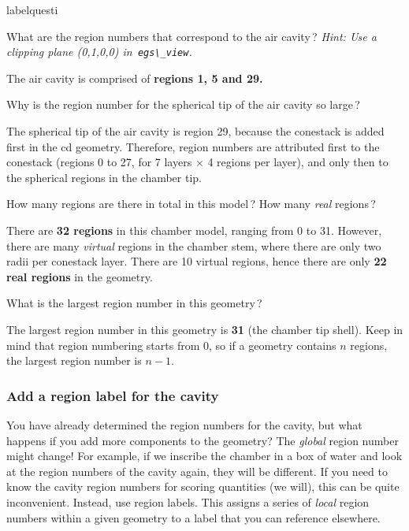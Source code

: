 \documentclass[12pt,twoside]{article}
\makeatletter
\renewcommand\thequesti         {\@arabic\c@questi}
\newenvironment{question}{
    \bfseries
    \edef\@questictr{questi}
    \expandafter
    \list \csname label\@questictr\endcsname {
        \usecounter\@questictr\def\makelabel##1{\hss\llap{##1}}
        \savebox{\questbox}             {\thequesti}
        \setlength\labelsep             {0.6em}
        \setlength\labelwidth           {\wd\questbox}
        \setlength\leftmargini          {\labelwidth}
        \addtolength{\leftmargini}      {\labelsep}
        \addtolength{\leftmargini}      {0.2em}
        \leftmargin\leftmargini
        \setlength\topsep               {1em}
        \setlength\itemsep              {1.2em}
        \setlength\parsep               {0.5em}
    }
}{\normalfont\endlist}
\newenvironment{answer}{\normalfont}{\relax}
\makeatother
\begin{document}
\begin{question}

\item What are the region numbers that correspond to the air cavity\,?
\textit{Hint: Use a clipping plane (0,1,0,0) in \,\Verb|egs\_view|.}

\begin{answer}
The air cavity is comprised of \textbf{regions 1, 5 and 29.}
\end{answer}

\item Why is the region number for the spherical tip of the air cavity so large\,?

\begin{answer}
The spherical tip of the air cavity is region 29, because the conestack is
added first in the cd geometry. Therefore, region numbers are attributed
first to the conestack (regions 0 to 27, for 7 layers $\times$ 4 regions per
layer), and only then to the spherical regions in the chamber tip.
\end{answer}

\item How many regions are there in total in this model\,? How
many \textit{real} regions\,?

\begin{answer}
There are \textbf{32 regions} in this chamber model, ranging from 0 to 31.
However, there are many \textit{virtual} regions in the chamber stem, where
there are only two radii per conestack layer. There are 10 virtual regions,
hence there are only \textbf{22 real regions} in the geometry.
\end{answer}

\item What is the largest region number in this geometry\,?

\begin{answer}
The largest region number in this geometry is \textbf{31} (the chamber tip
shell). Keep in mind that region numbering starts from 0, so if a geometry
contains $n$ regions, the largest region number is $n-1$.
\end{answer}

\end{question}

\subsubsection{Add a region label for the cavity}
You have already determined the region numbers for the cavity, but what happens
if you add more components to the geometry? The \textit{global} region number might
change! For example, if we inscribe the chamber in a box of water and look
at the region numbers of the cavity again, they will be different. If you need
to know the cavity region numbers for scoring quantities (we will), this can
be quite inconvenient. Instead, use region labels. This assigns a series
of \textit{local} region numbers within a given geometry to a label that you can reference
elsewhere.
\end{document}
